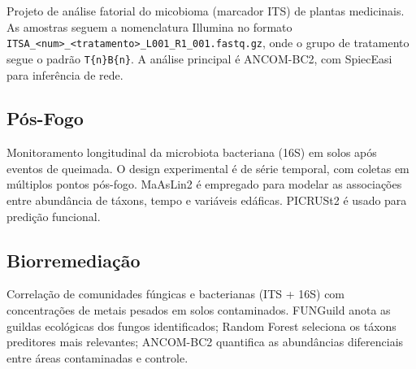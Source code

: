 Projeto de análise fatorial do micobioma (marcador ITS) de plantas
medicinais. As amostras seguem a nomenclatura Illumina no formato
\texttt{ITSA\_<num>\_<tratamento>\_L001\_R1\_001.fastq.gz}, onde o
grupo de tratamento segue o padrão \texttt{T\{n\}B\{n\}}. A análise
principal é ANCOM-BC2, com SpiecEasi para inferência de rede.

\subsection{Pós-Fogo}

Monitoramento longitudinal da microbiota bacteriana (16S) em solos
após eventos de queimada. O design experimental é de série temporal,
com coletas em múltiplos pontos pós-fogo. MaAsLin2 é empregado para
modelar as associações entre abundância de táxons, tempo e variáveis
edáficas. PICRUSt2 é usado para predição funcional.

\subsection{Biorremediação}

Correlação de comunidades fúngicas e bacterianas (ITS + 16S) com
concentrações de metais pesados em solos contaminados. FUNGuild
anota as guildas ecológicas dos fungos identificados; Random Forest
seleciona os táxons preditores mais relevantes; ANCOM-BC2 quantifica
as abundâncias diferenciais entre áreas contaminadas e controle.
